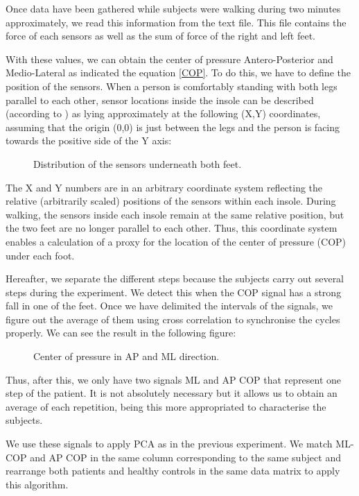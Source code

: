 Once data have been gathered while subjects were walking during two minutes approximately, we read this information from the text file. This file contains the force of each sensors as well as the sum of force of the right and left feet.

With these values, we can obtain the center of pressure Antero-Posterior and Medio-Lateral as indicated the equation \ref*{COP}. To do this, we have to define the position of the sensors. When a person is comfortably standing with both legs parallel to each other, sensor locations inside the insole can be described (according to \cite{Instr6}) as lying approximately at the following (X,Y) coordinates, assuming that the origin (0,0) is just between the legs and the person is facing towards the positive side of the Y axis:
\begin{figure}[H]
	\centering
	\caption{Distribution of the sensors underneath both feet.}
	\label{fig:DistributionSensors}
\end{figure}

The X and Y numbers are in an arbitrary coordinate system reflecting the relative (arbitrarily scaled) positions of the sensors within each insole. During walking, the sensors inside each insole remain at the same relative position, but the two feet are no longer parallel to each other. Thus, this coordinate system enables a calculation of a proxy for the location of the center of pressure (COP) under each foot.

Hereafter, we separate the different steps because the subjects carry out several steps during the experiment. We detect this when the COP signal has a strong fall in one of the feet. Once we have delimited the intervals of the signals, we figure out the average of them using cross correlation to synchronise the cycles properly. We can see the result in the following figure:
\begin{figure}[H]
	\centering
	\caption{Center of pressure in AP and ML direction.}
	\label{fig:COP}
\end{figure}

Thus, after this, we only have two signals ML and AP COP that represent one step of the patient. It is not absolutely necessary but it allows us to obtain an average of each repetition, being this more appropriated to characterise the subjects.

We use these signals to apply PCA as in the previous experiment. We match ML-COP and AP COP in the same column corresponding to the same subject and rearrange both patients and healthy controls in the same data matrix to apply this algorithm.

